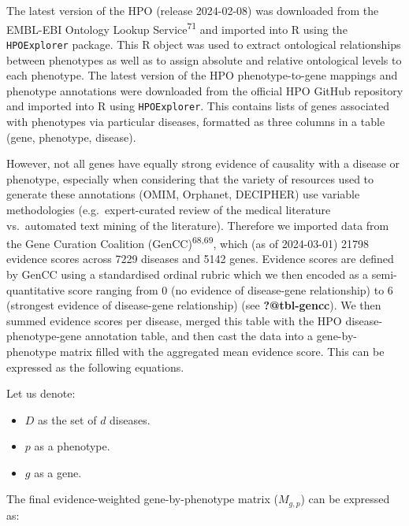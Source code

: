 \documentclass[
sn-nature
]{sn-jnl}
\begin{document}
The latest version of the HPO (release 2024-02-08) was downloaded from
the EMBL-EBI Ontology Lookup Service\textsuperscript{71} and imported
into R using the \texttt{HPOExplorer} package. This R object was used to
extract ontological relationships between phenotypes as well as to
assign absolute and relative ontological levels to each phenotype. The
latest version of the HPO phenotype-to-gene mappings and phenotype
annotations were downloaded from the official HPO GitHub repository and
imported into R using \texttt{HPOExplorer}. This contains lists of genes
associated with phenotypes via particular diseases, formatted as three
columns in a table (gene, phenotype, disease).

However, not all genes have equally strong evidence of causality with a
disease or phenotype, especially when considering that the variety of
resources used to generate these annotations (OMIM, Orphanet, DECIPHER)
use variable methodologies (e.g.~expert-curated review of the medical
literature vs.~automated text mining of the literature). Therefore we
imported data from the Gene Curation Coalition
(GenCC)\textsuperscript{68,69}, which (as of 2024-03-01) 21798 evidence
scores across 7229 diseases and 5142 genes. Evidence scores are defined
by GenCC using a standardised ordinal rubric which we then encoded as a
semi-quantitative score ranging from 0 (no evidence of disease-gene
relationship) to 6 (strongest evidence of disease-gene relationship)
(see \textbf{?@tbl-gencc}). We then summed evidence scores per disease,
merged this table with the HPO disease-phenotype-gene annotation table,
and then cast the data into a gene-by-phenotype matrix filled with the
aggregated mean evidence score. This can be expressed as the following
equations.

Let us denote:

\begin{itemize}
\item
  \(D\) as the set of \(d\) diseases.
\item
  \(p\) as a phenotype.
\item
  \(g\) as a gene.
\end{itemize}

The final evidence-weighted gene-by-phenotype matrix (\(M_{g,p}\)) can
be expressed as:

\hfill\break
\hfill\break
\end{document}
